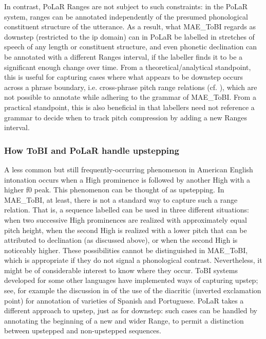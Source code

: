 \documentclass[11pt, twoside]{memoir}
\def\polar#1{{\relsize{-.5}\fontspec[Mapping=tex-text]{Roboto Mono}{#1}}}
\def\tobi#1{\polar{#1}}
\begin{document}
In contrast, PoLaR Ranges are not subject to such constraints: in the PoLaR system, ranges can be annotated independently of the presumed phonological constituent structure of the utterance. As a result, what MAE\_ToBI regards as downstep (restricted to the ip domain) can in PoLaR be labelled in stretches of speech of any length or constituent structure, and even phonetic declination can be annotated with a different Ranges interval, if the labeller finds it to be a significant enough change over time. From a theoretical\slash analytical standpoint, this is useful for capturing cases where what appears to be downstep occurs across a phrase boundary, i.e. cross-phrase pitch range relations (cf. \citealt{ladd88, brugos15}), which are not possible to annotate while adhering to the grammar of MAE\_ToBI. From a practical standpoint, this is also beneficial in that labellers need not reference a grammar to decide when to track pitch compression by adding a new Ranges interval.

\subsubsection{How ToBI and PoLaR handle upstepping}\label{sec:upstepping}
A less common but still frequently-occurring phenomenon in American English intonation occurs when a High prominence is followed by another High with a higher f0 peak.  This phenomenon can be thought of as upstepping. In MAE\_ToBI, at least, there is not a standard way to capture such a range relation.  That is, a sequence labelled \tobi{H* H*} can be used in three different situations: when two successive High prominences are realized with approximately equal pitch height, when the second High is realized with a lower pitch that can be attributed to declination (as discussed above), or when the second High is noticeably higher. These possibilities cannot be distinguished in MAE\_ToBI, which is appropriate if they do not signal a phonological contrast. Nevertheless, it might be of considerable interest to know where they occur. ToBI systems developed for some other languages have implemented ways of capturing upstep; see, for example the discussion in \citet{armstrong-14} of the use of the \tobi{¡} diacritic (inverted exclamation point) for annotation of varieties of Spanish and Portuguese. PoLaR takes a different approach to upstep, just as for downstep: such cases can be handled by annotating the beginning of a new and wider Range, to permit a distinction between upstepped and non-upstepped sequences.
\end{document}
